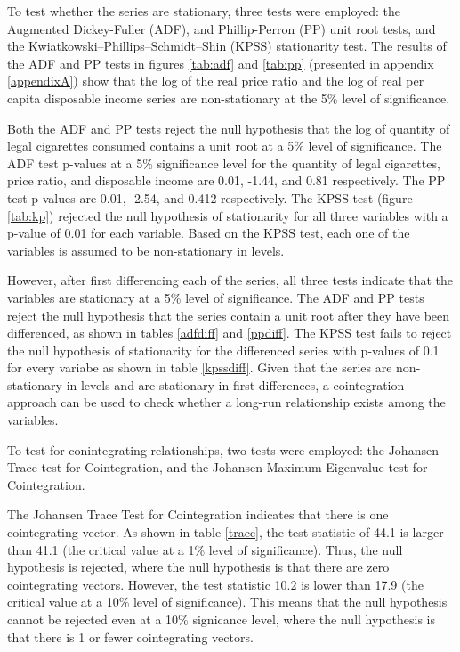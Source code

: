 \documentclass[12pt,afrikaans, english,letterpaper,oneside,
openany]{memoir}
\begin{document}
To test whether the series are stationary, three tests were employed:
the Augmented Dickey-Fuller (ADF), and Phillip-Perron (PP) unit root
tests, and the Kwiatkowski--Phillips--Schmidt--Shin (KPSS) stationarity
test. The results of the ADF and PP tests in figures \ref{tab:adf} and
\ref{tab:pp} (presented in appendix \ref{appendixA}) show that the log
of the real price ratio and the log of real per capita disposable income
series are non-stationary at the 5\% level of significance.

Both the ADF and PP tests reject the null hypothesis that the log of
quantity of legal cigarettes consumed contains a unit root at a 5\%
level of significance. The ADF test p-values at a 5\% significance level
for the quantity of legal cigarettes, price ratio, and disposable income
are 0.01, -1.44, and 0.81 respectively. The PP test p-values are 0.01,
-2.54, and 0.412 respectively. The KPSS test (figure \ref{tab:kp})
rejected the null hypothesis of stationarity for all three variables
with a p-value of 0.01 for each variable. Based on the KPSS test, each
one of the variables is assumed to be non-stationary in levels.

However, after first differencing each of the series, all three tests
indicate that the variables are stationary at a 5\% level of
significance. The ADF and PP tests reject the null hypothesis that the
series contain a unit root after they have been differenced, as shown in
tables \ref{adfdiff} and \ref{ppdiff}. The KPSS test fails to reject the
null hypothesis of stationarity for the differenced series with p-values
of 0.1 for every variabe as shown in table \ref{kpssdiff}. Given that
the series are non-stationary in levels and are stationary in first
differences, a cointegration approach can be used to check whether a
long-run relationship exists among the variables.

To test for conintegrating relationships, two tests were employed: the
Johansen Trace test for Cointegration, and the Johansen Maximum
Eigenvalue test for Cointegration.

The Johansen Trace Test for Cointegration indicates that there is one
cointegrating vector. As shown in table \ref{trace}, the test statistic
of 44.1 is larger than 41.1 (the critical value at a 1\% level of
significance). Thus, the null hypothesis is rejected, where the null
hypothesis is that there are zero cointegrating vectors. However, the
test statistic 10.2 is lower than 17.9 (the critical value at a 10\%
level of significance). This means that the null hypothesis cannot be
rejected even at a 10\% signicance level, where the null hypothesis is
that there is 1 or fewer cointegrating vectors.
\end{document}
